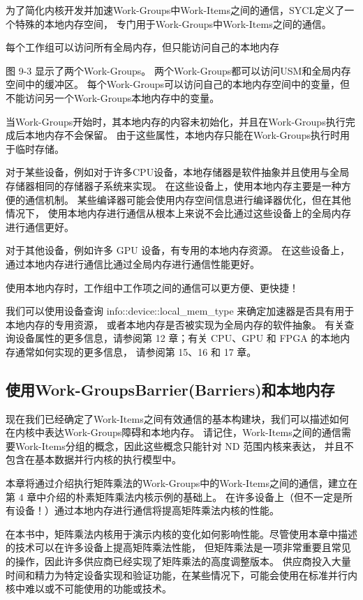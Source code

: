为了简化内核开发并加速Work-Groups中Work-Items之间的通信，SYCL定义了一个特殊的本地内存空间，
专门用于Work-Groups中Work-Items之间的通信。

{\color{red} 每个工作组可以访问所有全局内存，但只能访问自己的本地内存}

图 9-3 显示了两个Work-Groups。 两个Work-Groups都可以访问USM和全局内存空间中的缓冲区。 
每个Work-Groups可以访问自己的本地内存空间中的变量，但不能访问另一个Work-Groups本地内存中的变量。

当Work-Groups开始时，其本地内存的内容未初始化，并且在Work-Groups执行完成后本地内存不会保留。 
由于这些属性，本地内存只能在Work-Groups执行时用于临时存储。

对于某些设备，例如对于许多CPU设备，本地存储器是软件抽象并且使用与全局存储器相同的存储器子系统来实现。 
在这些设备上，使用本地内存主要是一种方便的通信机制。 
某些编译器可能会使用内存空间信息进行编译器优化，但在其他情况下，
使用本地内存进行通信从根本上来说不会比通过这些设备上的全局内存进行通信更好。

对于其他设备，例如许多 GPU 设备，有专用的本地内存资源。 
在这些设备上，通过本地内存进行通信比通过全局内存进行通信性能更好。

\begin{remark}
	使用本地内存时，工作组中工作项之间的通信可以更方便、更快捷！
\end{remark}

我们可以使用设备查询 info::device::local\_mem\_type 来确定加速器是否具有用于本地内存的专用资源，
或者本地内存是否被实现为全局内存的软件抽象。 
有关查询设备属性的更多信息，请参阅第 12 章；有关 CPU、GPU 和 FPGA 的本地内存通常如何实现的更多信息，
请参阅第 15、16 和 17 章。

\subsection{使用Work-GroupsBarrier(Barriers)和本地内存}
现在我们已经确定了Work-Items之间有效通信的基本构建块，我们可以描述如何在内核中表达Work-Groups障碍和本地内存。 
请记住，Work-Items之间的通信需要Work-Items分组的概念，因此这些概念只能针对 ND 范围内核来表达，
并且不包含在基本数据并行内核的执行模型中。

本章将通过介绍执行矩阵乘法的Work-Groups中的Work-Items之间的通信，建立在第 4 章中介绍的朴素矩阵乘法内核示例的基础上。 
在许多设备上（但不一定是所有设备！）通过本地内存进行通信将提高矩阵乘法内核的性能。

\begin{remark}[关于矩阵乘法的说明]
在本书中，矩阵乘法内核用于演示内核的变化如何影响性能。尽管使用本章中描述的技术可以在许多设备上提高矩阵乘法性能，
但矩阵乘法是一项非常重要且常见的操作，因此许多供应商已经实现了矩阵乘法的高度调整版本。
供应商投入大量时间和精力为特定设备实现和验证功能，在某些情况下，可能会使用在标准并行内核中难以或不可能使用的功能或技术。
\end{remark}

